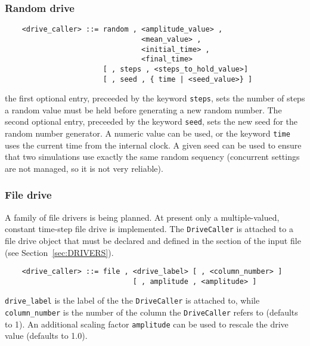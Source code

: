 \subsubsection{Random drive}
\begin{verbatim}
    <drive_caller> ::= random , <amplitude_value> ,
                                <mean_value> ,
                                <initial_time> ,
                                <final_time> 
                       [ , steps , <steps_to_hold_value>]
                       [ , seed , { time | <seed_value>} ]
\end{verbatim}
the first optional entry, preceeded by the keyword \texttt{steps}, sets the
number of steps a random value must be held before generating a new
random number. The second optional entry, preceeded by the keyword
\texttt{seed}, sets the new seed for the random number generator. A numeric
value can be used, or the keyword \texttt{time} uses the current time from
the internal clock. A given seed can be used to ensure that two
simulations use exactly the same random sequency (concurrent settings 
are not managed, so it is not very reliable).

\subsubsection{File drive}
A family of file drivers is being planned.
At present only a multiple-valued, constant time-step file drive is
implemented.
The \texttt{DriveCaller} is attached to a file drive object that must be declared
and defined in the  section 
of the input file (see Section~\ref{sec:DRIVERS}).
\begin{verbatim}
    <drive_caller> ::= file , <drive_label> [ , <column_number> ]
                              [ , amplitude , <amplitude> ]
\end{verbatim}
\texttt{drive\_label} is the label of the  
the \texttt{DriveCaller} is attached to, while
\texttt{column\_number} is the number of the column the \texttt{DriveCaller}
refers to (defaults to 1).
An additional scaling factor \texttt{amplitude} can be used to rescale
the drive value (defaults to 1.0).


